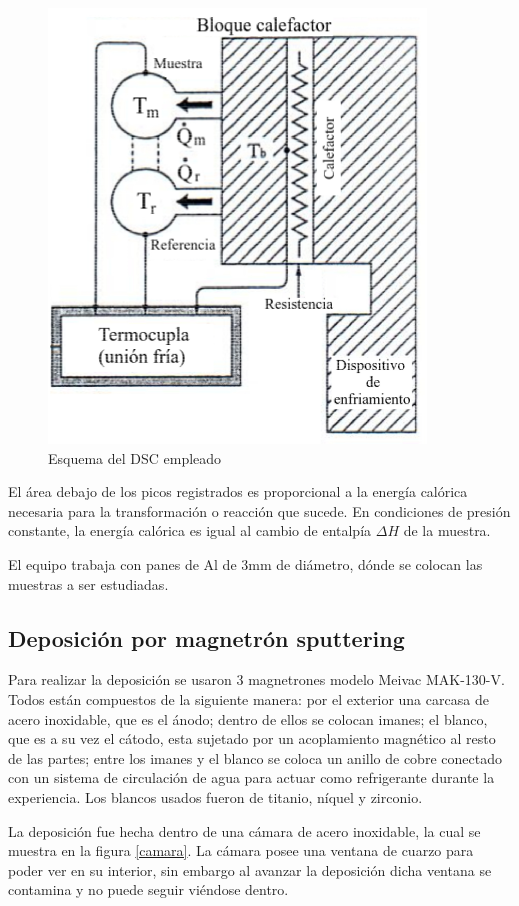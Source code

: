 \documentclass[12pt]{article}
\theoremstyle{definition}
\theoremstyle{remark}
\begin{document}
\begin{figure}[h]
	\centering
	\includegraphics[scale=0.2]{img/DSCscheme.png}
	\caption{Esquema del DSC empleado}
	\label{DSCscheme}
\end{figure}

El área debajo de los picos registrados es proporcional a la energía calórica necesaria para la transformación o reacción que sucede. En condiciones de presión constante, la energía calórica es igual al cambio de entalpía $\Delta H$ de la muestra.

El equipo trabaja con panes de Al de 3mm de diámetro, dónde se colocan las muestras a ser estudiadas.

\subsection{Deposición por magnetrón sputtering}
Para realizar la deposición se usaron 3 magnetrones modelo Meivac MAK-130-V. Todos están compuestos de la siguiente manera: por el exterior una carcasa de acero inoxidable, que es el ánodo; dentro de ellos se colocan imanes; el blanco, que es a su vez el cátodo, esta sujetado por un acoplamiento magnético al resto de las partes; entre los imanes y el blanco se coloca un anillo de cobre conectado con un sistema de circulación de agua para actuar como refrigerante durante la experiencia. Los blancos usados fueron de titanio, níquel y zirconio.

La deposición fue hecha dentro de una cámara de acero inoxidable, la cual se muestra en la figura \ref{camara}. La cámara posee una ventana de cuarzo para poder ver en su interior, sin embargo al avanzar la deposición dicha ventana se contamina y no puede seguir viéndose dentro.
\end{document}
